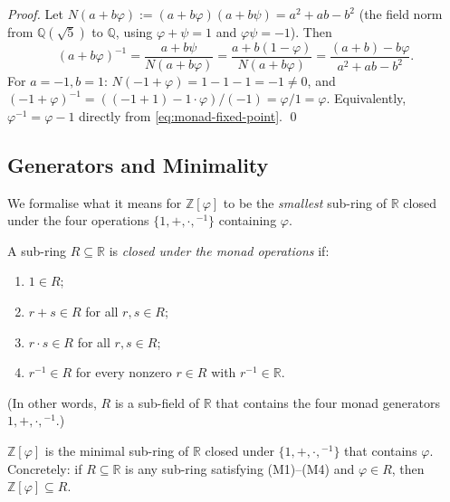 \begin{proof}
  Let $N(a+b\varphi) := (a+b\varphi)(a+b\psi) = a^2 + ab - b^2$
  (the field norm from $\mathbb{Q}(\sqrt{5})$ to $\mathbb{Q}$, using
  $\varphi + \psi = 1$ and $\varphi\psi = -1$).  Then
  \[
    (a + b\varphi)^{-1}
    = \frac{a + b\psi}{N(a+b\varphi)}
    = \frac{a + b(1-\varphi)}{N(a+b\varphi)}
    = \frac{(a+b) - b\varphi}{a^2+ab-b^2}.
  \]
  For $a=-1, b=1$: $N(-1+\varphi) = 1 - 1 - 1 = -1 \neq 0$, and
  $(-1+\varphi)^{-1} = ((-1+1)-1\cdot\varphi)/(-1) = \varphi/1 = \varphi$.
  Equivalently, $\varphi^{-1} = \varphi - 1$ directly from
  \eqref{eq:monad-fixed-point}.  \qed
\end{proof}

\subsection{Generators and Minimality}

We formalise what it means for $\mathbb{Z}[\varphi]$ to be the
\emph{smallest} sub-ring of $\mathbb{R}$ closed under the four
operations $\{1, +, \cdot, {}^{-1}\}$ containing $\varphi$.

\begin{definition}\label{def:closed-subring}
  A sub-ring $R \subseteq \mathbb{R}$ is \emph{closed under the monad
  operations} if:
  \begin{enumerate}
    \item[(M1)] $1 \in R$;
    \item[(M2)] $r + s \in R$ for all $r, s \in R$;
    \item[(M3)] $r \cdot s \in R$ for all $r, s \in R$;
    \item[(M4)] $r^{-1} \in R$ for every nonzero $r \in R$ with
      $r^{-1} \in \mathbb{R}$.
  \end{enumerate}
  (In other words, $R$ is a sub-field of $\mathbb{R}$ that contains
  the four monad generators $1, +, \cdot, {}^{-1}$.)
\end{definition}

\begin{theorem}\label{thm:trinity-monadic-closure}
  $\mathbb{Z}[\varphi]$ is the minimal sub-ring of $\mathbb{R}$
  closed under $\{1, +, \cdot, {}^{-1}\}$ that contains $\varphi$.
  Concretely: if $R \subseteq \mathbb{R}$ is any sub-ring satisfying
  (M1)--(M4) and $\varphi \in R$, then $\mathbb{Z}[\varphi] \subseteq R$.
\end{theorem}

